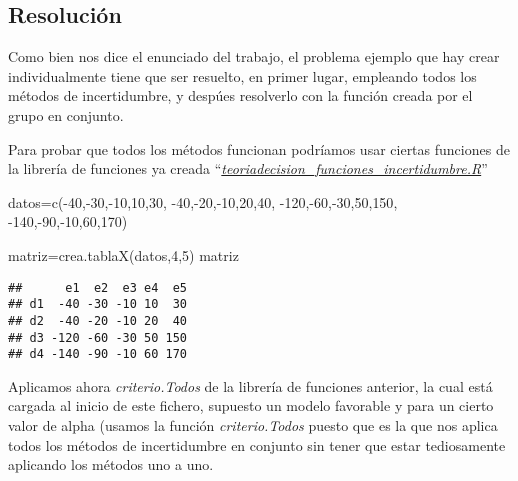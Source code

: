 \documentclass[
]{article}
\newenvironment{Shaded}{\begin{snugshade}}{\end{snugshade}}
\newcommand{\DecValTok}[1]{\textcolor[rgb]{0.00,0.00,0.81}{#1}}
\newcommand{\FunctionTok}[1]{\textcolor[rgb]{0.00,0.00,0.00}{#1}}
\newcommand{\NormalTok}[1]{#1}
\newcommand{\OtherTok}[1]{\textcolor[rgb]{0.56,0.35,0.01}{#1}}
\newcommand{\SpecialCharTok}[1]{\textcolor[rgb]{0.00,0.00,0.00}{#1}}
\begin{document}
\hypertarget{resoluciuxf3n}{%
\subsection{Resolución}\label{resoluciuxf3n}}

Como bien nos dice el enunciado del trabajo, el problema ejemplo que hay
crear individualmente tiene que ser resuelto, en primer lugar, empleando
todos los métodos de incertidumbre, y despúes resolverlo con la función
creada por el grupo en conjunto.

Para probar que todos los métodos funcionan podríamos usar ciertas
funciones de la librería de funciones ya creada
``\underline{\emph{teoriadecision\_funciones\_incertidumbre.R}}''

\begin{Shaded}
\begin{Highlighting}[]
\NormalTok{datos}\OtherTok{=}\FunctionTok{c}\NormalTok{(}\SpecialCharTok{{-}}\DecValTok{40}\NormalTok{,}\SpecialCharTok{{-}}\DecValTok{30}\NormalTok{,}\SpecialCharTok{{-}}\DecValTok{10}\NormalTok{,}\DecValTok{10}\NormalTok{,}\DecValTok{30}\NormalTok{,}
        \SpecialCharTok{{-}}\DecValTok{40}\NormalTok{,}\SpecialCharTok{{-}}\DecValTok{20}\NormalTok{,}\SpecialCharTok{{-}}\DecValTok{10}\NormalTok{,}\DecValTok{20}\NormalTok{,}\DecValTok{40}\NormalTok{,}
        \SpecialCharTok{{-}}\DecValTok{120}\NormalTok{,}\SpecialCharTok{{-}}\DecValTok{60}\NormalTok{,}\SpecialCharTok{{-}}\DecValTok{30}\NormalTok{,}\DecValTok{50}\NormalTok{,}\DecValTok{150}\NormalTok{,}
        \SpecialCharTok{{-}}\DecValTok{140}\NormalTok{,}\SpecialCharTok{{-}}\DecValTok{90}\NormalTok{,}\SpecialCharTok{{-}}\DecValTok{10}\NormalTok{,}\DecValTok{60}\NormalTok{,}\DecValTok{170}\NormalTok{)}

\NormalTok{matriz}\OtherTok{=}\FunctionTok{crea.tablaX}\NormalTok{(datos,}\DecValTok{4}\NormalTok{,}\DecValTok{5}\NormalTok{)}
\NormalTok{matriz}
\end{Highlighting}
\end{Shaded}

\begin{verbatim}
##      e1  e2  e3 e4  e5
## d1  -40 -30 -10 10  30
## d2  -40 -20 -10 20  40
## d3 -120 -60 -30 50 150
## d4 -140 -90 -10 60 170
\end{verbatim}

Aplicamos ahora \emph{criterio.Todos} de la librería de funciones
anterior, la cual está cargada al inicio de este fichero, supuesto un
modelo favorable y para un cierto valor de alpha (usamos la función
\emph{criterio.Todos} puesto que es la que nos aplica todos los métodos
de incertidumbre en conjunto sin tener que estar tediosamente aplicando
los métodos uno a uno.
\end{document}
